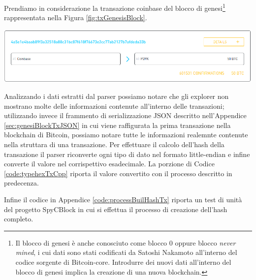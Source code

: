 \begin{example}

Prendiamo in considerazione la transazione coinbase del blocco di genesi\footnote{Il blocco di genesi è anche conosciuto come blocco 0 oppure blocco \emph{never mined}, i cui dati sono stati codificati da Satoshi Nakamoto all'interno del codice sorgente di Bitcoin-core. Introdurre dei nuovi dati all'interno del blocco di genesi implica la creazione di una nuova blockchain.} rappresentata nella Figura \ref{fig:txGenesisBlock}.

{\centering
\vspace{15pt}
\includegraphics[scale=0.35]{images/coinbase_tx_genesis_block.png}
\vspace{10pt}
\par}

Analizzando i dati estratti dal parser possiamo notare che gli explorer non mostrano molte delle informazioni contenute all'interno delle transazioni; utilizzando invece il frammento di serializzazione JSON descritto nell'Appendice \ref{sec:genesiBlockTxJSON} in cui viene raffigurata la prima transazione nella blockchain di Bitcoin, possiamo notare tutte le informazioni realemnte contenute nella struttara di una transazione.
Per effettuare il calcolo dell'hash della transazione il parser riconverte ogni tipo di dato nel formato little-endian e infine converte il valore nel corrispettivo esadecimale. La porzione di Codice \ref{code:typehexTxCpp} riporta il valore convertito con il processo descritto in predecenza.



Infine il codice in Appendice \ref{code:processBuilHashTx} riporta un test di unità del progetto SpyCBlock in cui si effettua il processo di creazione dell'hash completo.


\end{example}
